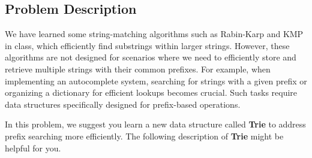 \providecommand{\tightlist}{\setlength{\itemsep}{0pt}\setlength{\parskip}{0pt}}
\setcounter{secnumdepth}{0}
\setcounter{figure}{0}
\setcounter{chapter}{3}

\subsection{Problem Description}\label{problem-description}

We have learned some string-matching algorithms such as Rabin-Karp and KMP in class, which efficiently find substrings within larger strings. However, these algorithms are not designed for scenarios where we need to efficiently store and retrieve multiple strings with their common prefixes. For example, when implementing an autocomplete system, searching for strings with a given prefix or organizing a dictionary for efficient lookups becomes crucial. Such tasks require data structures specifically designed for prefix-based operations.

In this problem, we suggest you learn a new data structure called \textbf{Trie} to address prefix searching more efficiently. The following description of \textbf{Trie} might be helpful for you.

